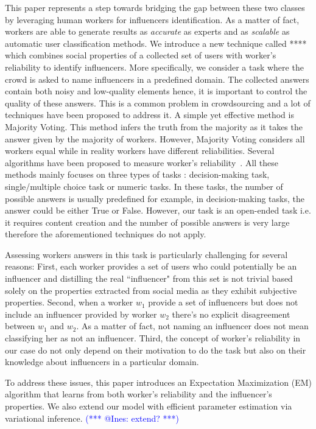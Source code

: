 \documentclass{article}
\makeatletter
\newcommand{\sys}{****\xspace}
\newcommand{\iar}[1]{\textcolor{blue}{(*** @Ines: #1 ***)}}
\makeatother
\begin{document}
This paper represents a step towards bridging the gap between these two classes by leveraging 
human workers for influencers identification. 
As a matter of fact, workers are able to generate results as 
\textit{accurate} as experts and as \textit{scalable} as automatic user classification methods.
We introduce a new technique called \sys
which combines social properties of a collected set of users with worker's reliability to identify influencers.
More specifically, we consider a task where the crowd is asked to name influencers in a predefined domain.
The collected answers contain both noisy and low-quality elements hence, it is important
to control the quality of these answers. This is a common problem in crowdsourcing 
and a lot of techniques have been proposed to address it.  A simple yet effective method is 
Majority Voting. This method infers the truth from the majority as it takes the answer given by the majority of 
workers. However, Majority Voting considers all workers equal while in reality workers have different reliabilities.
Several algorithms have been proposed to measure worker's reliability~\cite{demartini2012zencrowd,raykar2010learning,dawid1979maximum}. All these methods mainly focuses on three types of tasks
\cite{ZhengLLSC17}: decision-making task, single/multiple choice task or numeric tasks. In these tasks, the number of
possible answers is usually predefined for example, in decision-making tasks, the answer could be either True or False. 
However, our task is an open-ended task i.e. it requires content creation and the number of possible answers
 is very large therefore the aforementioned techniques do not apply. 

Assessing workers answers in this task is particularly challenging for several reasons:
First, each worker provides a set of users who could potentially be an influencer 
and distilling the real ``influencer" from this set is not trivial 
based solely on the properties extracted from social media as they exhibit subjective
properties.
Second, when a worker $w_{1}$ provide a set of influencers but does not include an 
influencer provided by worker $w_{2}$ there's no explicit disagreement between 
$w_{1}$ and $w_{2}$. As a matter of fact, not naming an influencer does not mean 
classifying her as not an influencer.  Third, the concept of worker's reliability in our case
do not only depend on their motivation to do the task but also on their knowledge about
influencers in a particular domain. 

To address these issues, this paper introduces an Expectation Maximization (EM) 
algorithm that learns from both worker's reliability and the influencer's properties.
We also extend our model with efficient parameter estimation via variational inference.
\iar{extend?}
\end{document}
